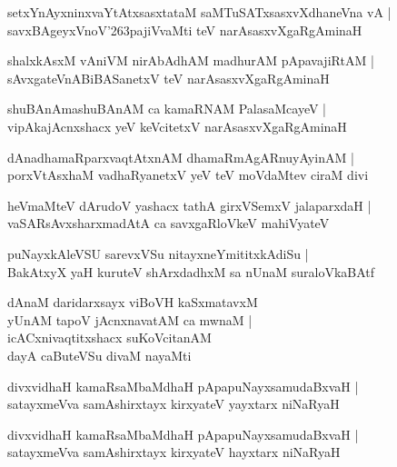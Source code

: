 \documentclass[twoside,12pt,openright]{book}
\def\S{\char'263}
\newcounter{shloka}[chapter]
\begin{document}
\begin{shloka}%
setxYnAyxninxvaYtAtxsasxtataM saMTuSATxsasxvXdhaneVna vA |\\
savxBAgeyxVnoV\S pajiVvaMti teV narAsasxvXgaRgAminaH 
\end{shloka}

\begin{shloka}%
shalxkAsxM vAniVM nirAbAdhAM madhurAM pApavajiRtAM |\\
sAvxgateVnABiBASanetxV teV narAsasxvXgaRgAminaH 
\end{shloka}

\begin{shloka}%
shuBAnAmashuBAnAM ca kamaRNAM PalasaMcayeV |\\
vipAkajAcnxshacx yeV keVcitetxV narAsasxvXgaRgAminaH 
\end{shloka}

\begin{shloka}%
dAnadhamaRparxvaqtAtxnAM dhamaRmAgARnuyAyinAM |\\
porxVtAsxhaM vadhaRyanetxV yeV teV moVdaMtev ciraM divi
\end{shloka}

\begin{shloka}%
heVmaMteV dArudoV yashacx tathA girxVSemxV jalaparxdaH |\\
vaSARsAvxsharxmadAtA ca savxgaRloVkeV mahiVyateV 
\end{shloka}

\begin{shloka}%
puNayxkAleVSU sarevxVSu nitayxneYmititxkAdiSu |\\
BakAtxyX yaH kuruteV shArxdadhxM sa nUnaM suraloVkaBAtf 
\end{shloka}

\begin{shloka}%
dAnaM daridarxsayx viBoVH kaSxmatavxM \\
yUnAM tapoV jAcnxnavatAM ca mwnaM |\\
icACxnivaqtitxshacx suKoVcitanAM \\
dayA caButeVSu divaM nayaMti
\end{shloka}

\begin{shloka}%
divxvidhaH kamaRsaMbaMdhaH pApapuNayxsamudaBxvaH |\\
satayxmeVva samAshirxtayx kirxyateV yayxtarx niNaRyaH 
\end{shloka}

\begin{shloka}%
divxvidhaH kamaRsaMbaMdhaH pApapuNayxsamudaBxvaH |\\
satayxmeVva samAshirxtayx kirxyateV hayxtarx niNaRyaH
\end{shloka}
\end{document}
